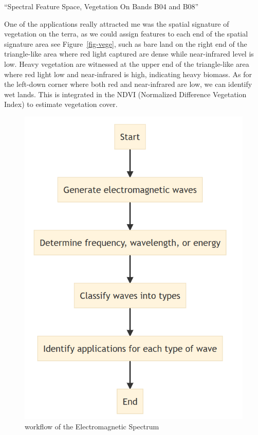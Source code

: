 \documentclass[
  letterpaper,
  DIV=11,
  numbers=noendperiod]{scrreprt}
\begin{document}
``Spectral Feature Space, Vegetation On Bands B04 and B08''

One of the applications really attracted me was the spatial signature of
vegetation on the terra, as we could assign features to each end of the
spatial signature area see Figure~\ref{fig-vege}, such as bare land on
the right end of the triangle-like area where red light captured are
dense while near-infrared level is low. Heavy vegetation are witnessed
at the upper end of the triangle-like area where red light low and
near-infrared is high, indicating heavy biomass. As for the left-down
corner where both red and near-infrared are low, we can identify wet
lands. This is integrated in the NDVI (Normalized Difference Vegetation
Index) to estimate vegetation cover.

\begin{figure}

{\centering \includegraphics{./images/workflow of the Electromagnetic Spectrum.png}

}

\caption{\label{fig-wkfl}workflow of the Electromagnetic Spectrum}

\end{figure}
\end{document}
